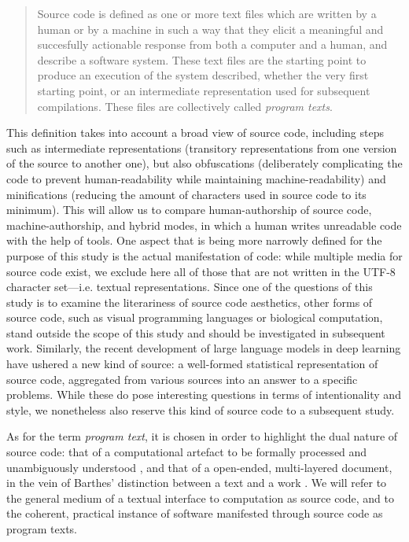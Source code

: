 \begin{quote}
    Source code is defined as one or more text files which are written by a human or by a machine in such a way that they elicit a meaningful and succesfully actionable response from both a computer and a human, and describe a software system. These text files are the starting point to produce an execution of the system described, whether the very first starting point, or an intermediate representation used for subsequent compilations. These files are collectively called \emph{program texts}.
\end{quote}

This definition takes into account a broad view of source code, including steps such as intermediate representations (transitory representations from one version of the source to another one), but also obfuscations (deliberately complicating the code to prevent human-readability while maintaining machine-readability) and minifications (reducing the amount of characters used in source code to its minimum). This will allow us to compare human-authorship of source code, machine-authorship, and hybrid modes, in which a human writes unreadable code with the help of tools. One aspect that is being more narrowly defined for the purpose of this study is the actual manifestation of code: while multiple media for source code exist, we exclude here all of those that are not written in the UTF-8 character set—i.e. textual representations. Since one of the questions of this study is to examine the literariness of source code aesthetics, other forms of source code, such as visual programming languages or biological computation, stand outside the scope of this study and should be investigated in subsequent work. Similarly, the recent development of large language models in deep learning have ushered a new kind of source: a well-formed statistical representation of source code, aggregated from various sources into an answer to a specific problems. While these do pose interesting questions in terms of intentionality and style, we nonetheless also reserve this kind of source code to a subsequent study.

As for the term \emph{program text}, it is chosen in order to highlight the dual nature of source code: that of a computational artefact to be formally processed and unambiguously understood \citep{detienne_software_2012}, and that of a open-ended, multi-layered document, in the vein of Barthes' distinction between a text and a work \citep{barthes_bruissement_1984}. We will refer to the general medium of a textual interface to computation as source code, and to the coherent, practical instance of software manifested through source code as program texts.

